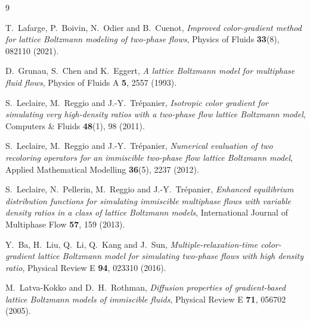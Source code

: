 \documentclass[11pt,a4paper]{article}
\theoremstyle{plain}
\theoremstyle{definition}
\begin{document}
\begin{thebibliography}{9}

T.~Lafarge, P.~Boivin, N.~Odier and B.~Cuenot,
\emph{Improved color-gradient method for lattice Boltzmann modeling of
two-phase flows}, Physics of Fluids \textbf{33}(8), 082110 (2021).

D.~Grunau, S.~Chen and K.~Eggert,
\emph{A lattice Boltzmann model for multiphase fluid flows},
Physics of Fluids A \textbf{5}, 2557 (1993).

S.~Leclaire, M.~Reggio and J.-Y.~Tr\'epanier,
\emph{Isotropic color gradient for simulating very high-density ratios with a
two-phase flow lattice Boltzmann model},
Computers \& Fluids \textbf{48}(1), 98 (2011).

S.~Leclaire, M.~Reggio and J.-Y.~Tr\'epanier,
\emph{Numerical evaluation of two recoloring operators for an immiscible
two-phase flow lattice Boltzmann model},
Applied Mathematical Modelling \textbf{36}(5), 2237 (2012).

S.~Leclaire, N.~Pellerin, M.~Reggio and J.-Y.~Tr\'epanier,
\emph{Enhanced equilibrium distribution functions for simulating immiscible
multiphase flows with variable density ratios in a class of lattice Boltzmann
models},
International Journal of Multiphase Flow \textbf{57}, 159 (2013).

Y.~Ba, H.~Liu, Q.~Li, Q.~Kang and J.~Sun,
\emph{Multiple-relaxation-time color-gradient lattice Boltzmann model for
simulating two-phase flows with high density ratio},
Physical Review E \textbf{94}, 023310 (2016).

M.~Latva-Kokko and D.~H.~Rothman,
\emph{Diffusion properties of gradient-based lattice Boltzmann models of
immiscible fluids},
Physical Review E \textbf{71}, 056702 (2005).

\end{thebibliography}
\end{document}
